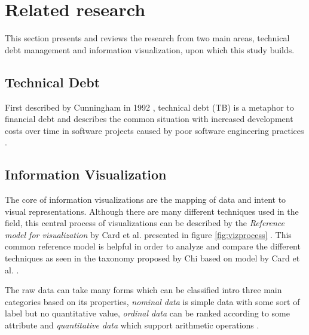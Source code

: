 

\section{Related research}

This section presents and reviews the research from two main areas, technical debt management and information visualization, upon which this study builds.

\subsection{Technical Debt}
First described by Cunningham in 1992 \cite{cunningham_wycash_1992}, technical debt (TB) is a metaphor to financial debt and describes the common situation with increased development costs over time in software projects caused by poor software engineering practices \cite{tom_exploration_2013}.


\subsection{Information Visualization}

The core of information visualizations are the mapping of data and intent to visual representations.
Although there are many different techniques used in the field, this central process of visualizations can be described by the \textit{Reference model for visualization} by Card et al. presented in figure \ref{fig:vizprocess} \cite{card_readings_1999}. 
This common reference model is helpful in order to analyze and compare the different techniques as seen in the taxonomy proposed by Chi based on model by Card et al. \cite{chi_taxonomy_2000}.



The raw data can take many forms which can be classified intro three main categories based on its properties, \textit{nominal data} is simple data with some sort of label but no quantitative value, \textit{ordinal data} can be ranked according to some attribute and \textit{quantitative data} which support arithmetic operations \cite{card_structure_1997}.
